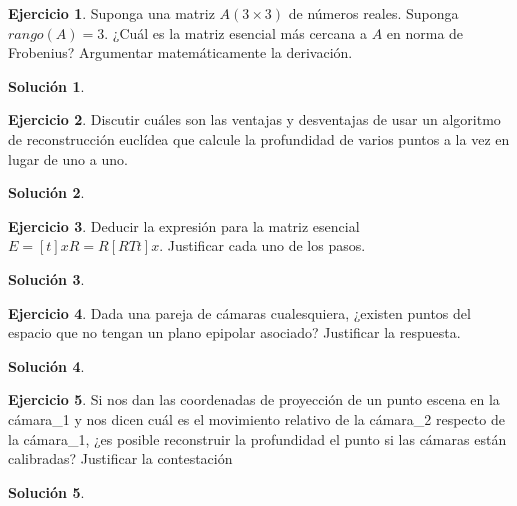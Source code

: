 \documentclass[a4paper, 11pt]{article}
\theoremstyle{definition}
\newtheorem{ejercicio}{Ejercicio}
\newtheorem*{solucion}{Solución}
\theoremstyle{theorem}
\begin{document}
    \begin{ejercicio}
        Suponga una matriz $A(3\times3)$ de números reales. Suponga $rango(A)=3$. ¿Cuál es la matriz esencial más cercana a $A$ en norma de Frobenius? Argumentar matemáticamente la derivación.
    \end{ejercicio}

    \begin{solucion}

    \end{solucion}

    \begin{ejercicio}
        Discutir cuáles son las ventajas y desventajas de usar un algoritmo de reconstrucción euclídea que calcule la profundidad de varios puntos a la vez en lugar de uno a uno.
    \end{ejercicio}

    \begin{solucion}

    \end{solucion}

    \begin{ejercicio}
        Deducir la expresión para la matriz esencial $E = [t]x R = R[RTt]x$. Justificar cada uno de los pasos.
    \end{ejercicio}

    \begin{solucion}

    \end{solucion}

    \begin{ejercicio}
        Dada una pareja de cámaras cualesquiera, ¿existen puntos del espacio que no tengan un plano epipolar asociado? Justificar la respuesta.
    \end{ejercicio}

    \begin{solucion}

    \end{solucion}

    \begin{ejercicio}
        Si nos dan las coordenadas de proyección de un punto escena en la cámara_1 y nos dicen cuál es el movimiento relativo de la cámara_2 respecto de la cámara_1, ¿es posible reconstruir la profundidad el punto si las cámaras están calibradas? Justificar la contestación
    \end{ejercicio}

    \begin{solucion}

    \end{solucion}
\end{document}
